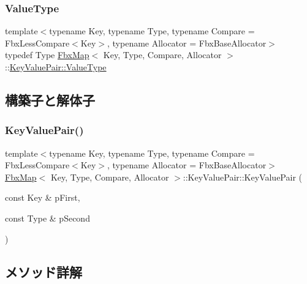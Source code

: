 \mbox{\label{class_fbx_map_1_1_key_value_pair_a716c83c1f6dabf173132b5acde84a9fe}} 
\subsubsection{\texorpdfstring{Value\+Type}{ValueType}}
{\footnotesize\ttfamily template$<$typename Key, typename Type, typename Compare = Fbx\+Less\+Compare$<$\+Key$>$, typename Allocator = Fbx\+Base\+Allocator$>$ \\
typedef Type \hyperlink{class_fbx_map}{Fbx\+Map}$<$ Key, Type, Compare, Allocator $>$\+::\hyperlink{class_fbx_map_1_1_key_value_pair_a716c83c1f6dabf173132b5acde84a9fe}{Key\+Value\+Pair\+::\+Value\+Type}}



\subsection{構築子と解体子}
\mbox{\label{class_fbx_map_1_1_key_value_pair_ad6f068ce05b4e108a0218ffaa45c0994}} 
\subsubsection{\texorpdfstring{Key\+Value\+Pair()}{KeyValuePair()}}
{\footnotesize\ttfamily template$<$typename Key, typename Type, typename Compare = Fbx\+Less\+Compare$<$\+Key$>$, typename Allocator = Fbx\+Base\+Allocator$>$ \\
\hyperlink{class_fbx_map}{Fbx\+Map}$<$ Key, Type, Compare, Allocator $>$\+::Key\+Value\+Pair\+::\+Key\+Value\+Pair (\begin{DoxyParamCaption}\item[{const Key \&}]{p\+First,  }\item[{const Type \&}]{p\+Second }\end{DoxyParamCaption})}



\subsection{メソッド詳解}
\mbox{\label{class_fbx_map_1_1_key_value_pair_a6e43d1f01dc25d31294138c4c60b3b11}} 
